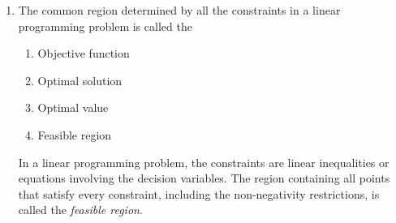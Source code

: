 \begin{enumerate}[label=\thesubsection.\arabic*, ref=\thesubsection.\theenumi]
\begin{enumerate}
\end{enumerate}

\solution
Let the given point be
\begin{align}
P=\brak{0,1,2}.
\end{align}

Any point on the $x$-axis has coordinates
\begin{align}
Q=\brak{x,0,0}.
\end{align}
The direction vector of the $x$-axis is
\begin{align}
\vec{d}=\brak{1,0,0}.
\end{align}
Since $PQ$ is perpendicular to the $x$-axis,
\begin{align}
\overrightarrow{PQ}\cdot\vec{d}=0.
\end{align}
Now,
\begin{align}
\overrightarrow{PQ}
=Q-P=\brak{x,-1,-2}.
\end{align}
Therefore,
\begin{align}
\brak{x,-1,-2}\cdot\brak{1,0,0}=0.
\end{align}
Expanding the dot product,
\begin{align}
x\brak{1}+\brak{-1}\brak{0}+\brak{-2}\brak{0}=0.
\end{align}
Hence,
\begin{align}
x=0.
\end{align}
Therefore, the foot of the perpendicular is
\begin{align}
Q=\brak{0,0,0}.
\end{align}

\item
The common region determined by all the constraints in a
linear programming problem is called the

\begin{enumerate}
    \item Objective function
    \item Optimal solution
    \item Optimal value
    \item Feasible region
\end{enumerate}
\solution
In a linear programming problem, the constraints are
linear inequalities or equations involving the
decision variables.
The region containing all points that satisfy every
constraint, including the non-negativity restrictions,
is called the \textit{feasible region}.


\end{enumerate}
